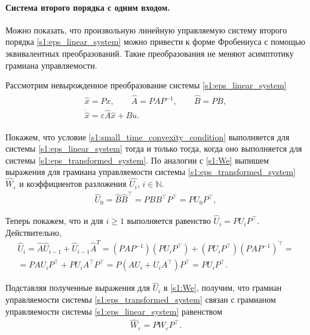\documentclass[../main.tex]{subfiles}
\begin{document}
\paragraph{Система второго порядка с одним входом.}
Можно показать, что произвольную линейную управляемую систему второго порядка \eqref{s1:eps_linear_system} можно привести к форме Фробениуса с помощью эквивалентных преобразований.
Такие преобразования не меняют асимптотику грамиана управляемости.

Рассмотрим невырожденное преобразование системы \eqref{s1:eps_linear_system}
\begin{gather}\label{s1:eps_transformed_system}
\begin{gathered}
	\hat{x} = P x, \qquad \hat{A} = P A P^{-1}, \qquad \hat{B} = P B, \\
	\dot{\hat{x}} = \varepsilon \hat{A} \hat{x} + \hat{B} u. 
\end{gathered}
\end{gather}

Покажем, что условие \eqref{s1:small_time_convexity_condition} выполняется для системы \eqref{s1:eps_linear_system} тогда и только тогда, когда оно выполняется для системы \eqref{s1:eps_transformed_system}.
 По аналогии с \eqref{s1:We} выпишем выражения для грамиана управляемости системы \eqref{s1:eps_transformed_system} $\hat{W}_{\varepsilon}$ и коэффициентов разложения $\hat{U_i}$, $i \in \mathbb{N}$.
\begin{gather*}
	\hat{U}_0 = \hat{B} \hat{B}^{\top} = P B B^{\top} P^{\top} = P U_0 P^{\top}, 
\end{gather*}

Теперь покажем, что и для $i \geqslant 1$ выполняется равенство $\hat{U}_i = P U_i P^{\top}$.
Действительно,
\begin{gather*}
	\hat{U}_i = \hat{A} \hat{U}_{i-1} + \hat{U}_{i-1} \hat{A}^T = \left(P A P^{-1} \right) \left( P U_i P^{\top} \right) + \left( P U_i P^{\top}\right) \left(P A P^{-1} \right)^{\top} = \\ 
	= P A U_i P^{\top} + P U_i A^{\top} P^{\top} = P \left( A U_i + U_i A^{\top} \right) P^{\top} = P U_i P^{\top}.
\end{gather*}

Подставляя полученные выражения для $\hat{U}_i$ в \eqref{s1:We}, получим, что грамиан управляемости системы \eqref{s1:eps_transformed_system} связан с грамианом управляемости системы \eqref{s1:eps_linear_system} равенством
\begin{gather*}
	\hat{W}_{\varepsilon} = P W_{\varepsilon} P^{\top}.
\end{gather*}
\end{document}

